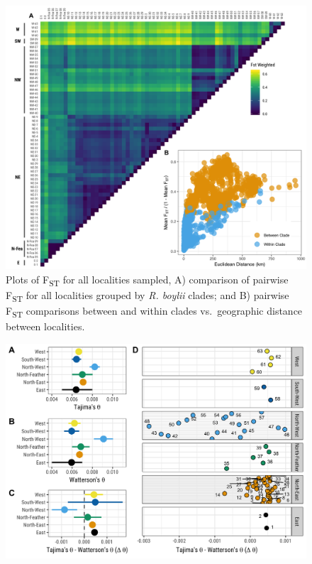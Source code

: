\documentclass[proquest,12pt,final]{ucthesis-CA2012} %
\begin{document}
\begin{ucmainmatter}
\begin{figure}
{\centering \includegraphics[width=0.95\linewidth]{figure/ch3/fig_05_combined_fst_cowplot_annotated} 

}

\caption{Plots of F\textsubscript{ST} for all localities sampled,
A) comparison of pairwise F\textsubscript{ST} for all localities grouped
by \emph{R. boylii} clades; and B) pairwise F\textsubscript{ST}
comparisons between and within clades vs.~geographic distance between
localities.}\label{fig:CH3F5fst}
\end{figure}
\clearpage








\begin{figure}

{\centering \includegraphics[width=0.95\linewidth]{figure/ch3/fig_06_thetas_taj_watt_tdiff_95CI_fig06} 

}
\end{figure}
\end{ucmainmatter}
\end{document}
